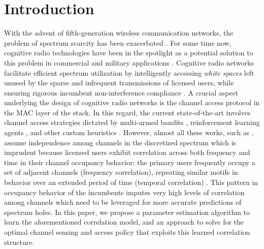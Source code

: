 \documentclass[10pt,twocolumn]{IEEEtran}
\begin{document}
\section{Introduction}\label{I}
With the advent of fifth-generation wireless communication networks, the problem of spectrum scarcity has been exacerbated \cite{7158089}. For some time now, cognitive radio technologies have been in the spotlight as a potential solution to this problem in commercial and military applications \cite{6882406}. Cognitive radio networks facilitate efficient spectrum utilization by intelligently accessing \emph{white spaces} left unused by the sparse and infrequent transmissions of licensed users, while ensuring rigorous incumbent non-interference compliance \cite{4562537}. A crucial aspect underlying the design of cognitive radio networks is the channel access protocol in the MAC layer of the stack. In this regard, the current state-of-the-art involves channel access strategies dictated by multi-armed bandits \cite{7094730}, reinforcement learning agents \cite{6507570}, and other custom heuristics \cite{6956794, 4554696, 7032338}. However, almost all these works, such as \cite{7094730, 6507570, 5496076, 4804743}, assume independence among channels in the discretized spectrum which is imprudent because licensed users exhibit correlation across both frequency and time in their channel occupancy behavior: the primary users frequently occupy a set of adjacent channels (frequency correlation), repeating similar motifs in behavior over an extended period of time (temporal correlation) \cite{6188346, 4213046,McHenry:2006:CSO:1234388.1234389}. This pattern in occupancy behavior of the incumbents imputes very high levels of correlation among channels which need to be leveraged for more accurate predictions of spectrum holes. In this paper, we propose a parameter estimation algorithm to learn the aforementioned correlation model, and an approach to solve for the optimal channel sensing and access policy that exploits this learned correlation structure.
\end{document}
